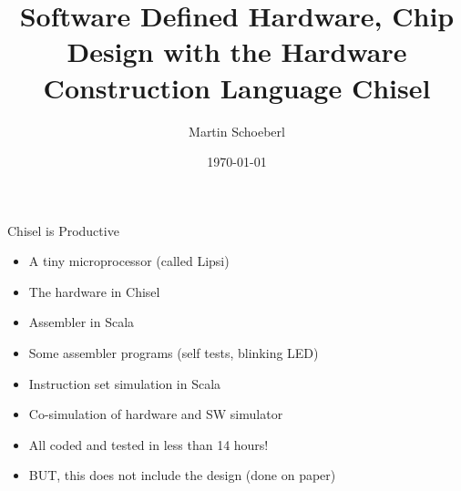 

\newif\ifbook


\title{Software Defined Hardware, Chip Design with the Hardware Construction Language Chisel}
\author{Martin Schoeberl}
\date{\today}



\begin{frame}
\titlepage
\end{frame}


\begin{frame}[fragile]{Chisel is Productive}
\begin{itemize}
\item A tiny microprocessor (called Lipsi)
\item The hardware in Chisel
\item Assembler in Scala
\item Some assembler programs (self tests, blinking LED)
\item Instruction set simulation in Scala
\item Co-simulation of hardware and SW simulator
\end{itemize}
\begin{itemize}
\item All coded and tested in less than 14 hours!
\item BUT, this does not include the design (done on paper)
\end{itemize}
\end{frame}





